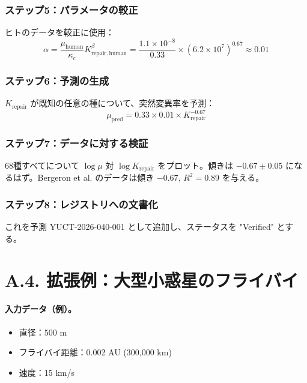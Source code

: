 \documentclass[13pt,a4paper]{ltjsarticle}
\begin{document}
	\subsubsection*{ステップ5：パラメータの較正}
	ヒトのデータを較正に使用：
	\[
	\alpha = \frac{\mu_{\mathrm{human}}}{\kappa_c} K_{\mathrm{repair,human}}^{\beta} = \frac{1.1\times 10^{-8}}{0.33} \times (6.2\times 10^7)^{0.67} \approx 0.01
	\]
	
	\subsubsection*{ステップ6：予測の生成}
	$K_{\mathrm{repair}}$ が既知の任意の種について、突然変異率を予測：
	\[
	\mu_{\mathrm{pred}} = 0.33 \times 0.01 \times K_{\mathrm{repair}}^{-0.67}
	\]
	
	\subsubsection*{ステップ7：データに対する検証}
	68種すべてについて $\log \mu$ 対 $\log K_{\mathrm{repair}}$ をプロット。傾きは $-0.67 \pm 0.05$ になるはず。Bergeron et al. のデータは傾き $-0.67$, $R^2 = 0.89$ を与える。
	
	\subsubsection*{ステップ8：レジストリへの文書化}
	これを予測 YUCT-2026-040-001 として追加し、ステータスを "Verified" とする。
	
	
	\section*{A.4. 拡張例：大型小惑星のフライバイ}
	
	\paragraph{入力データ（例）。}
	\begin{itemize}[leftmargin=*]
		\item 直径：500 m
		\item フライバイ距離：0.002 AU (300,000 km)
		\item 速度：15 km/s
	\end{itemize}
	
\end{document}
